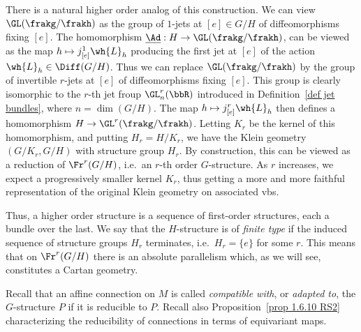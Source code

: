 \begin{rem}
    There is a natural higher order analog of this construction. We can view $\GL(\frakg\slash\frakh)$ as the group of $1$-jets at $[e]\in G\slash H$ of diffeomorphisms fixing $[e]$. The homomorphism $\underline{\Ad}:H\to \GL(\frakg\slash\frakh)$, can be viewed as the map $h\mapsto j^1_{[e]}\wh{L}_h$ producing the first jet at $[e]$ of the action $\wh{L}_h\in\Diff(G\slash H)$. Thus we can replace $\GL(\frakg\slash\frakh)$ by the group of invertible $r$-jets at $[e]$ of diffeomorphisms fixing $[e]$. This group is clearly isomorphic to the $r$-th jet froup $\GL^r_n(\bbR)$ introduced in Definition~\ref{def jet bundles}, where $n=\dim(G\slash H)$. The map $h\mapsto j^r_{[e]}\wh{L}_h$ then defines a homomorphism $H\to \GL^r(\frakg\slash\frakh)$. Letting $K_r$ be the kernel of this homomorphism, and putting $H_r=H\slash K_r$, we have the Klein geometry $(G\slash K_r,G\slash H)$ with structure group $H_r$. By construction, this can be viewed as a reduction of $\Fr^r(G\slash H)$, i.e.\ an $r$-th order $G$-structure. As $r$ increases, we expect a progressively smaller kernel $K_r$, thus getting a more and more faithful representation of the original Klein geometry on associated \glspl{vb}.

    Thus, a higher order structure is a sequence of first-order structures, each a bundle over the last. We say that the $H$-structure is of \emph{finite type} if the induced sequence of structure groups $H_r$ terminates, i.e.\ $H_r=\{e\}$ for some $r$. This means that on $\Fr^r (G\slash H)$ there is an absolute parallelism which, as we will see, constitutes a Cartan geometry.
\end{rem}


Recall that an affine connection on $M$ is called \emph{compatible with}, or \emph{adapted to}, the $G$-structure $P$ if it is reducible to $P$. Recall also Proposition~\ref{prop 1.6.10 RS2} characterizing the reducibility of connections in terms of equivariant maps. 


